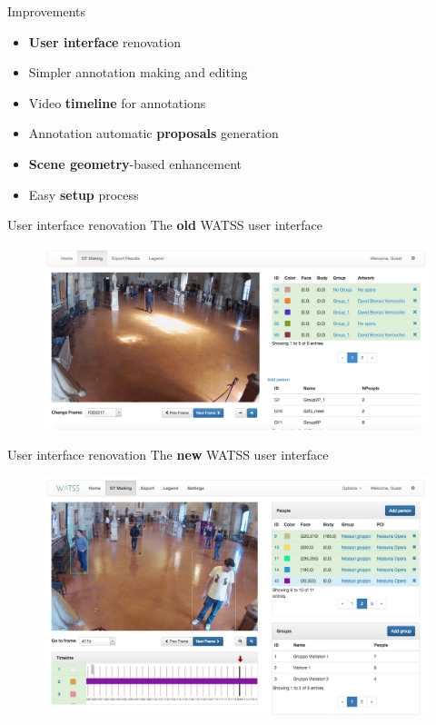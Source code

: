 \documentclass{beamer}
\begin{document}
\begin{tframe}{Improvements}
\begin{itemize}
\vspace{0.3cm}
\item \textbf{User interface} renovation
\vspace{0.2cm}
\item Simpler annotation making and editing
\vspace{0.2cm}
\item Video \textbf{timeline} for annotations
\vspace{0.2cm}
\item Annotation automatic \textbf{proposals} generation
\vspace{0.2cm}
\item \textbf{Scene geometry}-based enhancement
\vspace{0.2cm}
\item Easy \textbf{setup} process
\end{itemize}
\end{tframe}

\begin{tframe}{User interface renovation}
The \textbf{old} WATSS user interface
\begin{figure}[h]
\centering
\includegraphics[width=1\textwidth]{images/watss_old.jpg}
\end{figure}
\end{tframe}

\begin{tframe}{User interface renovation}
The \textbf{new} WATSS user interface
\begin{figure}[h]
\centering
\includegraphics[scale=0.22]{images/watss-gui.jpg}
\end{figure}
\end{tframe}
\end{document}
